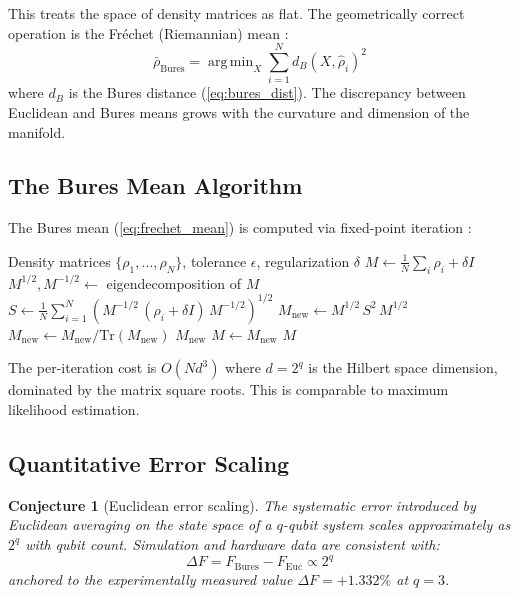 \documentclass[12pt,a4paper]{article}
\DeclareMathOperator*{\argmin}{arg\,min}
\newtheorem{conjecture}{Conjecture}
\begin{document}
This treats the space of density matrices as flat. The geometrically correct operation is the Fr\'echet (Riemannian) mean \cite{frechet1948,karcher1977}:
\begin{equation}
    \bar{\rho}_{\text{Bures}} = \argmin_X \sum_{i=1}^N d_B(X, \hat{\rho}_i)^2
    \label{eq:frechet_mean}
\end{equation}
where $d_B$ is the Bures distance (\ref{eq:bures_dist}). The discrepancy between Euclidean and Bures means grows with the curvature and dimension of the manifold.

\subsection{The Bures Mean Algorithm}

The Bures mean (\ref{eq:frechet_mean}) is computed via fixed-point iteration \cite{moakher2005,bhatia2019}:

\begin{algorithm}[H]
\caption{Bures (Riemannian) Mean of Density Matrices}
\label{alg:bures}
\begin{algorithmic}[1]
\Require Density matrices $\{\rho_1, \ldots, \rho_N\}$, tolerance $\epsilon$, regularization $\delta$
\State $M \gets \frac{1}{N}\sum_i \rho_i + \delta I$ 
    \State $M^{1/2}, M^{-1/2} \gets$ eigendecomposition of $M$ 
    \State $S \gets \frac{1}{N} \sum_{i=1}^N \left(M^{-1/2}\, (\rho_i + \delta I)\, M^{-1/2}\right)^{1/2}$
    \State $M_{\text{new}} \gets M^{1/2}\, S^2\, M^{1/2}$ 
    \State $M_{\text{new}} \gets M_{\text{new}} / \text{Tr}(M_{\text{new}})$ 
        \State \Return $M_{\text{new}}$
    \EndIf
    \State $M \gets M_{\text{new}}$
\EndFor
\State \Return $M$
\end{algorithmic}
\end{algorithm}

The per-iteration cost is $O(N d^3)$ where $d = 2^q$ is the Hilbert space dimension, dominated by the matrix square roots. This is comparable to maximum likelihood estimation.

\subsection{Quantitative Error Scaling}

\begin{conjecture}[Euclidean error scaling]
\label{thm:scaling}
The systematic error introduced by Euclidean averaging on the state space of a $q$-qubit system scales approximately as $2^q$ with qubit count. Simulation and hardware data are consistent with:
\begin{equation}
    \Delta F = F_{\text{Bures}} - F_{\text{Euc}} \propto 2^q
\end{equation}
anchored to the experimentally measured value $\Delta F = +1.332\%$ at $q = 3$.
\end{conjecture}
\end{document}
